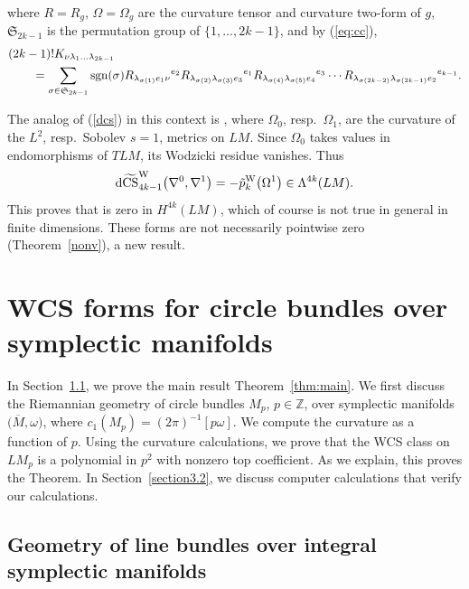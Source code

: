 \documentclass[10pt,a4paper]{amsart}
\numberwithin{equation}{section}
\theoremstyle{definition}
\newcommand{\BbZ}{{\mathbb Z}}
\newcommand{\Z}{\BbZ}
\newcommand{\ocs}{\widetilde{{\rm CS}}}
\newcommand{\tp}{\tilde p}
\newcommand{\sgn}{{\rm sgn}}
\newcommand{\om}{\overline{M}}
\newcommand{\omp}{M_p}
\begin{document}
\noindent where $R = R_g$, $\Omega = \Omega_g$ are the curvature tensor and curvature two-form of $g$,
 $\mathfrak S_{2k-1}$ is the permutation group of $\{1,\dots,2k-1\}$,
and by (\ref{eq:cc}),
\begin{align}\label{K_tensor}
& (2k-1)!K_{\nu \lambda_1 \dots \lambda_{2k-1}} \\
&\qquad{}= \sum_{\sigma\in \mathfrak S_{2k-1} } \sgn({\sigma})
R_{\lambda_{\sigma (1)} e_1 \nu}{}^{e_{2}}
R_{\lambda_{\sigma (2) } \lambda_{\sigma (3)} e_{3}}{}^{e_1}
R_{\lambda_{\sigma (4) } \lambda_{\sigma (5)} e_{4}}{}^{e_{3}}
\cdots
R_{\lambda_{\sigma (2k-2) } \lambda_{\sigma (2k-1)} e_{2}}{}^{e_{k-1}}.
\nonumber
\end{align}



The analog of (\ref{dcs}) in this context is
\smash{${\rm d}\ocs^{\rm W}_{4k-1}\bigl(\nabla^0,\nabla^1\bigr) = \tp^{\rm W}_k\bigl(\Omega^0\bigr) - \tp^{\rm W}_k\bigl(\Omega^1\bigr)$},
where $\Omega_0$, resp.~$\Omega_1$, are the curvature of the $L^2$, resp.~Sobolev $s=1$, metrics on $LM$.
Since $\Omega_0$ takes values in endomorphisms of $TLM$, its Wodzicki residue vanishes. Thus
\begin{equation}\label{dwcs}
{\rm d}\ocs^{\rm W}_{4k-1}\bigl(\nabla^0,\nabla^1\bigr) = - \tp_k^{\rm W}\bigl(\Omega^1\bigr)\in \Lambda^{4k}(LM).
\end{equation}
This proves that \smash{$\bigl[\tp_k^{\rm W}\bigl(\Omega^1\bigr)\bigr]$} is zero in $H^{4k}(LM)$, which of course is not true in general in finite dimensions. These forms are not necessarily pointwise zero (Theorem~\ref{nonv}), a new result.

\section{WCS forms for circle bundles over symplectic manifolds}\label{section3}

In Section~\ref{section3.1}, we prove the main result Theorem~\ref{thm:main}. We first discuss the Riemannian geometry of circle bundles $\omp$, $p\in \Z$, over symplectic manifolds $\bigl(\om,\omega\bigr)$, where $c_1(\omp) = (2\pi)^{-1}[p\omega]$. We compute the curvature as a function of $p$. Using the curvature calculations, we prove that the WCS class on $L\omp$ is a polynomial in $p^2$ with nonzero top coefficient. As we explain, this proves the Theorem. In Section~\ref{section3.2}, we discuss computer calculations that verify our calculations.


\subsection{Geometry of line bundles over integral symplectic manifolds}\label{section3.1}
\end{document}
